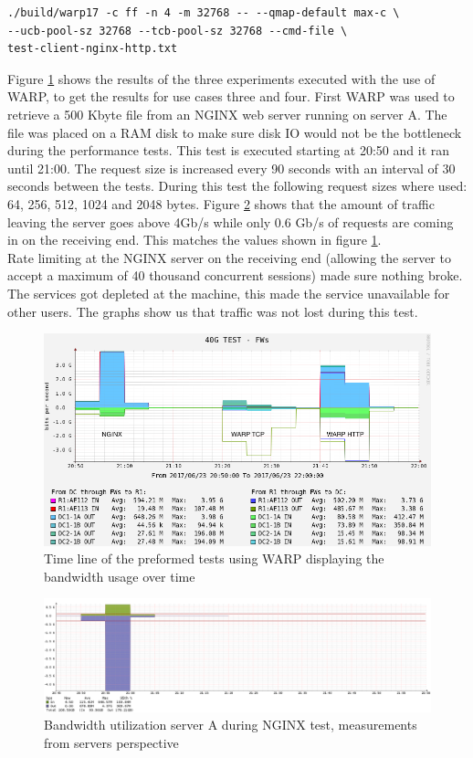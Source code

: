\begin{verbatim}
./build/warp17 -c ff -n 4 -m 32768 -- --qmap-default max-c \
--ucb-pool-sz 32768 --tcb-pool-sz 32768 --cmd-file \
test-client-nginx-http.txt 
\end{verbatim} 

Figure \ref{fig:warptime} shows the results of the three experiments executed with the use of WARP, to get the results for use cases three and four. 
First WARP was used to retrieve a 500 Kbyte file from an NGINX web server running on server A.
The file was placed on a RAM disk to make sure disk IO would not be the bottleneck during the performance tests. 
This test is executed starting at 20:50 and it ran until 21:00. The request size is increased every 90 seconds with an interval of 30 seconds between the tests.
During this test the following request sizes where used: 64, 256, 512, 1024 and 2048 bytes. 
Figure \ref{fig:realnginx} shows that the amount of traffic leaving the server goes above 4Gb/s while only 0.6 Gb/s of requests are coming in on the receiving end. 
This matches the values shown in figure \ref{fig:warptime}. \\
Rate limiting at the NGINX server on the receiving end (allowing the server to accept a maximum of 40 thousand concurrent sessions) made sure nothing broke. The services got depleted at the machine, this made the service unavailable for other users.
The graphs show us that traffic was not lost during this test.

\begin{figure}[]
  \includegraphics[scale=0.5]{images/warp-timeline.png}
  \caption{Time line of the preformed tests using WARP displaying the bandwidth usage over time}
  \label{fig:warptime}
\end{figure}

\begin{figure}
  \includegraphics[scale=0.35]{images/real-nginx.png}
  \caption{Bandwidth utilization server A during NGINX test, measurements from servers perspective }
  \label{fig:realnginx}
\end{figure}



